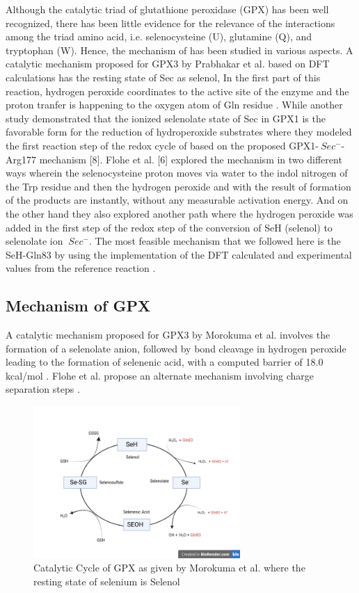 \documentclass[journal=jacsat,manuscript=article]{achemso}
\begin{document}
Although the catalytic triad of glutathione peroxidase (GPX) has been well recognized, there has been little evidence for the relevance of the interactions among the triad amino acid, i.e. selenocysteine (U), glutamine (Q), and tryptophan (W). Hence, the mechanism of has been studied in various aspects. A catalytic mechanism proposed for GPX3 by Prabhakar et al. based on DFT calculations has the resting state of Sec as selenol, In the first part of this reaction, hydrogen peroxide coordinates to the active site of the enzyme and the proton tranfer is happening to the oxygen atom of Gln residue \cite{prabhakar_elucidation_2005,prabhakar_is_2006}. While another study demonstrated that the ionized selenolate state of Sec in GPX1 is the favorable form for the reduction of hydroperoxide substrates where they modeled the ﬁrst reaction step of the redox cycle of based on the proposed GPX1-\({\ Sec^-}\)- Arg177 mechanism [8]. Flohe et al. [6]\cite{orian_selenocysteine_2015} explored the mechanism in two different ways wherein the selenocysteine proton moves via water to the indol nitrogen of the Trp residue and then the hydrogen peroxide and with the result of formation of  the products are instantly, without any measurable activation energy. And on the other hand they also explored another path where the hydrogen peroxide was added in the first step of the redox step of the conversion of SeH (selenol) to selenolate ion \({\ Sec^-}\)\cite{flohe_glutathione_2022,orian_selenocysteine_2015}. The most feasible mechanism that we followed here is the SeH-Gln83 by using the implementation of the DFT calculated and experimental values from the reference reaction \cite{prabhakar_is_2006}. 

\subsection{Mechanism of GPX}

A catalytic mechanism proposed for GPX3 by Morokuma et al. involves the formation of a selenolate anion, followed by bond cleavage in hydrogen peroxide leading to the formation of selenenic acid, with a computed barrier of 18.0 kcal/mol \cite{Prabhakar2006}. Flohe et al. propose an alternate mechanism involving charge separation steps \cite{Orian2015}.

\begin{figure}[h]
\includegraphics[width=0.7\textwidth]{figures/Catalytic_cycle.png}
\caption{Catalytic Cycle of GPX as given by Morokuma et al. where the resting state of selenium is Selenol}
\label{fig:figure1}
\end{figure}
\end{document}
